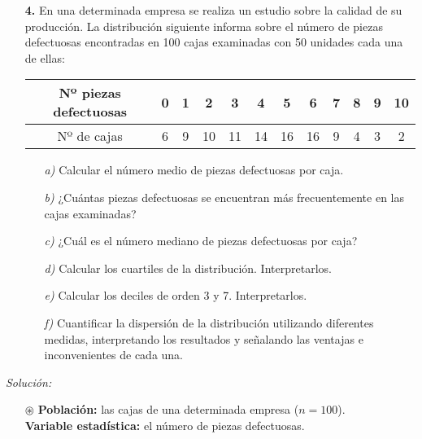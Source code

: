 \documentclass[11pt,a4paper]{article}
\theoremstyle{definition}
\begin{document}


\pagebreak

\begin{itemize}
	\item[\textbf{4.}] En una determinada empresa se realiza un estudio sobre la calidad de su producción. La distribución siguiente informa sobre el número de piezas defectuosas encontradas en 100 cajas
examinadas con 50 unidades cada una de ellas:


\begin{table}[!htbp]
\hspace{2cm}
\begin{tabular}{|c|||c|c|c|c|c|c|c|c|c|c|c|}
\hline
Nº piezas defectuosas & 0 & 1 & 2 & 3 & 4 & 5 & 6 & 7 & 8 & 9 & 10 \\ \hline
Nº de cajas			  & 6 & 9 & 10 & 11 & 14 & 16 & 16 & 9 & 4 & 3 & 2 \\ \hline
\end{tabular}
\end{table}
	\begin{itemize}
		\item[\emph{a)}] Calcular el número medio de piezas defectuosas por caja.
		\item[\emph{b)}] ¿Cuántas piezas defectuosas se encuentran más frecuentemente en las cajas examinadas?
		\item[\emph{c)}] ¿Cuál es el número mediano de piezas defectuosas por caja?
		\item[\emph{d)}] Calcular los cuartiles de la distribución. Interpretarlos.
		\item[\emph{e)}] Calcular los deciles de orden 3 y 7. Interpretarlos.
		\item[\emph{f)}] Cuantificar la dispersión de la distribución utilizando diferentes medidas, interpretando los resultados y señalando las ventajas e inconvenientes de cada una.
	\end{itemize}
\end{itemize}

{\color{grey}\hrulefill}

\emph{Solución:}

\begin{itemize}
		\item[$\circledast$] \textbf{Población:} las cajas de una determinada empresa ($n=100$). \\ \textbf{Variable estadística:} el número de piezas defectuosas.
\end{itemize}
\end{document}
